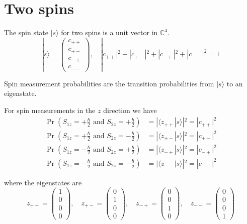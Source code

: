 

\section*{Two spins}

The spin state $|s\rangle$ for two spins is a unit vector in $\mathbb C^4$.
\begin{equation*}
|s\rangle=\begin{pmatrix}c_{++}\\c_{+-}\\c_{-+}\\c_{--}\end{pmatrix},\quad
|c_{++}|^2+|c_{+-}|^2+|c_{-+}|^2+|c_{--}|^2=1
\end{equation*}

Spin measurement probabilities are the transition probabilities from $|s\rangle$
to an eigenstate.

\bigskip
For spin measurements in the $z$ direction we have
\begin{align*}
\Pr\left(S_{1z}=+\tfrac{\hbar}{2}\text{ and }S_{2z}=+\tfrac{\hbar}{2}\right)
&=|\langle z_{++}|s\rangle|^2=|c_{++}|^2
\\
\Pr\left(S_{1z}=+\tfrac{\hbar}{2}\text{ and }S_{2z}=-\tfrac{\hbar}{2}\right)
&=|\langle z_{+-}|s\rangle|^2=|c_{+-}|^2
\\
\Pr\left(S_{1z}=-\tfrac{\hbar}{2}\text{ and }S_{2z}=+\tfrac{\hbar}{2}\right)
&=|\langle z_{-+}|s\rangle|^2=|c_{-+}|^2
\\
\Pr\left(S_{1z}=-\tfrac{\hbar}{2}\text{ and }S_{2z}=-\tfrac{\hbar}{2}\right)
&=|\langle z_{--}|s\rangle|^2=|c_{--}|^2
\end{align*}

where the eigenstates are
\begin{equation*}
z_{++}=\begin{pmatrix}1\\0\\0\\0\end{pmatrix},\quad
z_{+-}=\begin{pmatrix}0\\1\\0\\0\end{pmatrix},\quad
z_{-+}=\begin{pmatrix}0\\0\\1\\0\end{pmatrix},\quad
z_{--}=\begin{pmatrix}0\\0\\0\\1\end{pmatrix}
\end{equation*}

